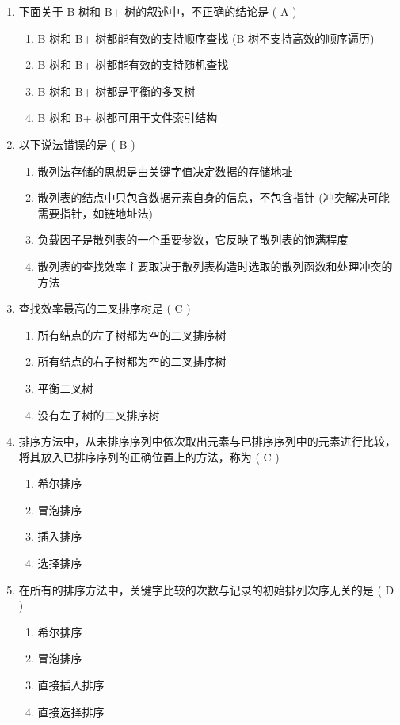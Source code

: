 \documentclass[12pt, a4paper]{article}
\begin{document}
\begin{enumerate}[label=\arabic*.]
    \item 下面关于 B 树和 B+ 树的叙述中，不正确的结论是 ( A )
    \begin{enumerate}
        \item B 树和 B+ 树都能有效的支持顺序查找 (B 树不支持高效的顺序遍历)
        \item B 树和 B+ 树都能有效的支持随机查找
        \item B 树和 B+ 树都是平衡的多叉树
        \item B 树和 B+ 树都可用于文件索引结构
    \end{enumerate}

    \item 以下说法错误的是 ( B )
    \begin{enumerate}
        \item 散列法存储的思想是由关键字值决定数据的存储地址
        \item 散列表的结点中只包含数据元素自身的信息，不包含指针 (冲突解决可能需要指针，如链地址法)
        \item 负载因子是散列表的一个重要参数，它反映了散列表的饱满程度
        \item 散列表的查找效率主要取决于散列表构造时选取的散列函数和处理冲突的方法
    \end{enumerate}

    \item 查找效率最高的二叉排序树是 ( C )
    \begin{enumerate}
        \item 所有结点的左子树都为空的二叉排序树
        \item 所有结点的右子树都为空的二叉排序树
        \item 平衡二叉树
        \item 没有左子树的二叉排序树
    \end{enumerate}

    \item 排序方法中，从未排序序列中依次取出元素与已排序序列中的元素进行比较，将其放入已排序序列的正确位置上的方法，称为 ( C )
    \begin{enumerate}
        \item 希尔排序
        \item 冒泡排序
        \item 插入排序
        \item 选择排序
    \end{enumerate}

    \item 在所有的排序方法中，关键字比较的次数与记录的初始排列次序无关的是 ( D )
    \begin{enumerate}
        \item 希尔排序
        \item 冒泡排序
        \item 直接插入排序
        \item 直接选择排序
    \end{enumerate}


\end{enumerate}
\end{document}
